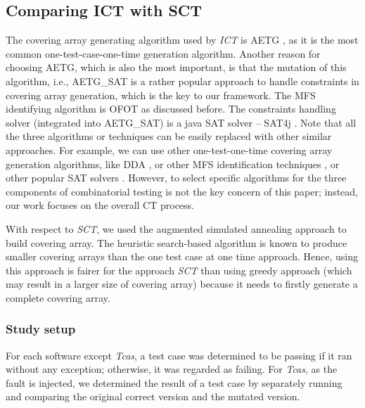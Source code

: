 \documentclass[journal,12pt,onecolumn,draftclsnofoot,]{IEEEtran}
\begin{document}
\subsection{Comparing ICT with SCT}\label{sec:emprical:CompareSCT}
The covering array generating algorithm used by \emph{ICT} is AETG \cite{cohen1997aetg}, as it is the most common one-test-case-one-time generation algorithm. Another reason for choosing AETG, which is also the most important, is that the mutation of this algorithm, i.e., AETG\_SAT \cite{cohen2007exploiting,cohen2008constructing} is a rather popular approach to handle constraints in covering array generation, which is the key to our framework. The MFS identifying algorithm is OFOT \cite{nie2011minimal} as discussed before. The constraints handling solver (integrated into AETG\_SAT) is a java SAT solver -- SAT4j \cite{le2010sat4j}.  Note that all the three algorithms or techniques can be easily replaced with other similar approaches. For example, we can use other one-test-one-time covering array generation algorithms, like DDA \cite{bryce2007density}, or other MFS identification techniques \cite{zhang2011characterizing,niu2013identifying}, or other popular SAT solvers \cite{een2004extensible}. However, to select specific algorithms for the three components of combinatorial testing is not the key concern of this paper; instead, our work focuses on the overall CT process.

With respect to \emph{SCT}, we used the {\color{red}augmented} simulated annealing approach \cite{cohen2003augmenting,cohen2008constructing2} to build covering array. The heuristic search-based algorithm is known to produce smaller covering arrays than the one test case at one time approach. Hence, using this approach is fairer for the approach \emph{SCT} than using greedy approach (which may result in a larger size of covering array) because it needs to firstly generate a complete covering array.


\subsubsection{Study setup}
For each software except \emph{Tcas}, a test case was determined to be passing if it ran without any exception; otherwise, it was regarded as failing. For \emph{Tcas}, as the fault is injected, we determined the result of a test case by separately running and comparing the original correct version and the mutated version.
\end{document}
